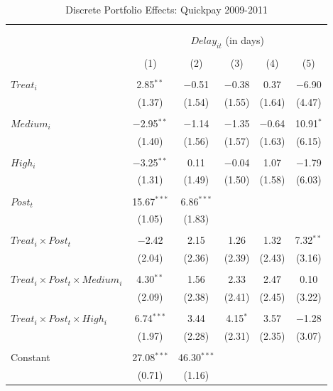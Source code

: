 \documentclass[
]{article}
\begin{document}
\begin{table}[H] \centering 
  \caption{Discrete Portfolio Effects: Quickpay 2009-2011} 
  \label{} 
\small 
\begin{tabular}{@{\extracolsep{-2pt}}lccccc} 
\\[-1.8ex]\hline 
\hline \\[-1.8ex] 
\\[-1.8ex] & \multicolumn{5}{c}{$Delay_{it}$ (in days)} \\ 
\\[-1.8ex] & (1) & (2) & (3) & (4) & (5)\\ 
\hline \\[-1.8ex] 
 $Treat_i$ & 2.85$^{**}$ & $-$0.51 & $-$0.38 & 0.37 & $-$6.90 \\ 
  & (1.37) & (1.54) & (1.55) & (1.64) & (4.47) \\ 
  & & & & & \\ 
 $Medium_i$ & $-$2.95$^{**}$ & $-$1.14 & $-$1.35 & $-$0.64 & 10.91$^{*}$ \\ 
  & (1.40) & (1.56) & (1.57) & (1.63) & (6.15) \\ 
  & & & & & \\ 
 $High_i$ & $-$3.25$^{**}$ & 0.11 & $-$0.04 & 1.07 & $-$1.79 \\ 
  & (1.31) & (1.49) & (1.50) & (1.58) & (6.03) \\ 
  & & & & & \\ 
 $Post_t$ & 15.67$^{***}$ & 6.86$^{***}$ &  &  &  \\ 
  & (1.05) & (1.83) &  &  &  \\ 
  & & & & & \\ 
 $Treat_i \times Post_t$ & $-$2.42 & 2.15 & 1.26 & 1.32 & 7.32$^{**}$ \\ 
  & (2.04) & (2.36) & (2.39) & (2.43) & (3.16) \\ 
  & & & & & \\ 
 $Treat_i \times Post_t \times Medium_i$ & 4.30$^{**}$ & 1.56 & 2.33 & 2.47 & 0.10 \\ 
  & (2.09) & (2.38) & (2.41) & (2.45) & (3.22) \\ 
  & & & & & \\ 
 $Treat_i \times Post_t \times High_i$ & 6.74$^{***}$ & 3.44 & 4.15$^{*}$ & 3.57 & $-$1.28 \\ 
  & (1.97) & (2.28) & (2.31) & (2.35) & (3.07) \\ 
  & & & & & \\ 
 Constant & 27.08$^{***}$ & 46.30$^{***}$ &  &  &  \\ 
  & (0.71) & (1.16) &  &  &  \\ 

\end{tabular}
\end{table}
\end{document}

